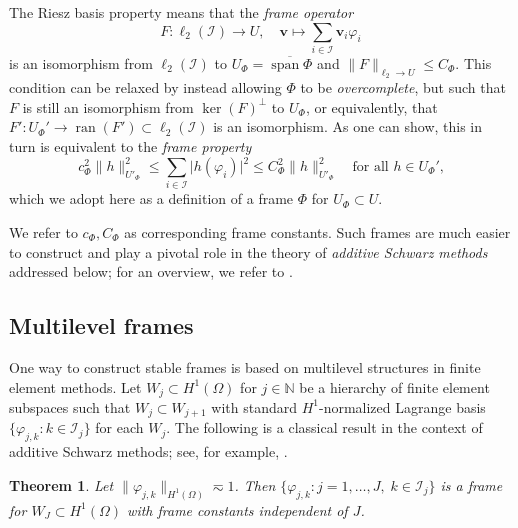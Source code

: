 \documentclass[a4paper,11pt]{amsart}
\DeclareMathOperator{\ran}{ran}
\DeclareMathOperator{\linspan}{span}
\providecommand{\abs}[1]{\lvert#1\rvert}
\providecommand{\norm}[1]{\lVert#1\rVert}
\numberwithin{equation}{section}
\newtheorem{theorem}{Theorem}
\theoremstyle{definition}
\theoremstyle{remark}
\theoremstyle{plain}
\newcommand{\N}{\mathbb{N}}
\begin{document}
The Riesz basis property means that the {\em frame operator}
\begin{equation}\label{eq:F}
  F \colon \ell_2(\mathcal I) \to U, \quad  \mathbf v \mapsto \sum_{i \in \mathcal I} \mathbf v_i \varphi_i
\end{equation}
is an isomorphism from $\ell_2(\mathcal I)$ to $U_\Phi = \overline{\linspan \Phi}$ and 
$\|F\|_{\ell_2\to U}\le C_\Phi$.
This condition can be relaxed by instead allowing $\Phi$ to be {\em overcomplete}, but such that $F$ is still an isomorphism from $\ker(F)^\bot$ to $U_\Phi$, or equivalently, that $F' \colon U_\Phi' \to \ran(F') \subset \ell_2(\mathcal I)$ is an isomorphism. As one can show, this in turn is equivalent to the \emph{frame property}
\begin{equation}\label{eq:frameprop}
 c_\Phi^2  \norm{ h }^2_{U'_\Phi}  \leq \sum_{i \in \mathcal I} \abs{ h(\varphi_i) }^2  \leq  C^2_\Phi  \norm{ h }_{U'_\Phi}^2 \quad\text{for all $h \in U_\Phi'$,}
\end{equation}
which  we adopt here  as a definition of a frame $\Phi$  for $U_\Phi \subset U$. 

We refer to 
$c_\Phi, C_\Phi$ as corresponding frame constants. Such frames are much easier to construct and play a pivotal role in the theory of {\em additive Schwarz methods} addressed below; for an overview, we refer to \cite{Oswald}.

\subsection{Multilevel frames}\label{sec:multilevel}
%
%
One way to construct stable frames is based on multilevel structures in finite element methods. Let $W_j \subset H^1(\Omega)$ for $j \in \N$ be a hierarchy of finite element subspaces such that $W_j \subset W_{j+1}$ with standard $H^{1}$-normalized Lagrange basis $\{ \varphi_{j, k} \colon k \in \mathcal I_j \}$ for each $W_j$.
The following is a classical result in the context of additive Schwarz methods; see, for example, \cite{Oswald,BPX,HSS:08}.

\begin{theorem}\label{thm:bpx}
 Let $\norm{ \varphi_{j,k} }_{H^1(\Omega)} \eqsim 1$. Then $\{ \varphi_{j,k} \colon j = 1, \ldots, J , \; k \in \mathcal I_j \}$ is a frame for $W_J \subset H^1(\Omega)$ with frame constants independent of $J$.
\end{theorem}
\end{document}
